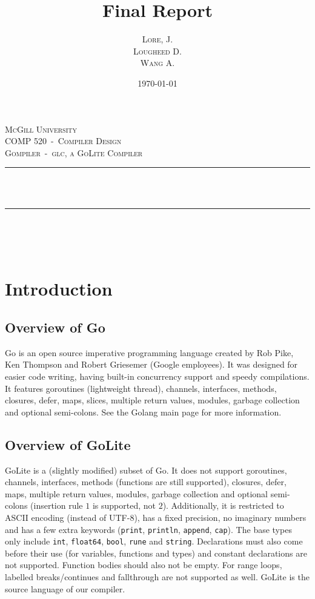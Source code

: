 \documentclass[11pt]{article}
\author{\textsc{Lore}, J.\\ \textsc{Lougheed} D.\\ \textsc{Wang} A.}
\date{\today}
\title{Final Report}
\newcommand{\HRule}{\rule{\linewidth}{0.5mm}}
\begin{document}
\begin{titlepage}
  \center%

  \textsc{\LARGE McGill University}\\[1.5cm]
  \textsc{\Large COMP 520~-~Compiler Design}\\[0.5cm]
  \textsc{\large Gompiler~-~glc, a GoLite Compiler}\\[0.5cm]

  \HRule~\\[0.4cm]
  { \huge \bfseries \thetitle}\\[0.4cm]
  \HRule~\\[1.5cm]

  \theauthor\\%
  [3cm]

  {\large \thedate}\\[2cm]

  \vfill

\end{titlepage}
\tableofcontents
\newpage
\section{Introduction}
\subsection{Overview of Go}
Go\cite{goliteinfo} is an open source imperative programming language
created by Rob Pike, Ken Thompson and Robert Griesemer (Google
employees). It was designed for easier code writing, having built-in
concurrency support and speedy compilations. It features goroutines
(lightweight thread), channels, interfaces, methods, closures, defer,
maps, slices, multiple return values, modules, garbage collection and
optional semi-colons. See the Golang main page\cite{golang} for more
information.
\subsection{Overview of GoLite}
GoLite\cite{goliteinfo} is a (slightly modified) subset of Go. It does
not support goroutines, channels, interfaces, methods (functions are
still supported), closures, defer, maps, multiple return values,
modules, garbage collection and optional semi-colons (insertion
rule\cite{gospec:semicolon} $1$ is supported, not $2$). Additionally,
it is restricted to ASCII encoding (instead of UTF-8), has a fixed
precision, no imaginary numbers and has a few extra keywords
(\texttt{print}, \texttt{println}, \texttt{append}, \texttt{cap}). The
base types only include \texttt{int}, \texttt{float64}, \texttt{bool},
\texttt{rune} and \texttt{string}. Declarations must also come before
their use (for variables, functions and types) and constant
declarations are not supported. Function bodies should also not be
empty. For range loops, labelled breaks/continues and fallthrough are
not supported as well. GoLite is the source language of our compiler.
\end{document}

